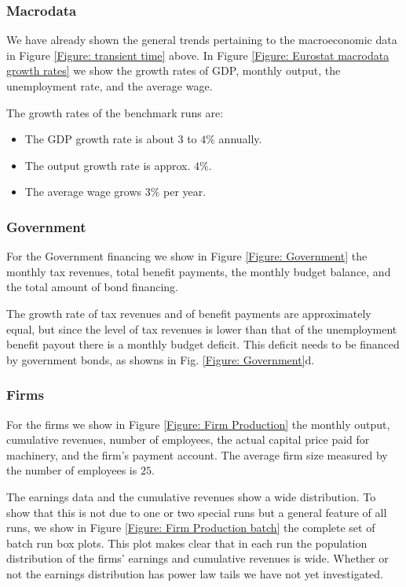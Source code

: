\subsubsection*{Macrodata}
We have already shown the general trends pertaining to the macroeconomic data in Figure \ref{Figure: transient time} above. 
In Figure \ref{Figure: Eurostat macrodata growth rates} we show the growth rates of GDP, monthly output, the unemployment rate, and the average wage.

The growth rates of the benchmark runs are:
\begin{itemize}
\item The GDP growth rate is about $3$ to $4\%$ annually.
\item The output growth rate is approx. $4\%$.
\item The average wage grows $3\%$ per year.
\end{itemize}

\subsubsection*{Government}
For the Government financing we show in Figure \ref{Figure: Government} the monthly tax revenues, total benefit payments, the monthly budget balance,
and the total amount of bond financing.

The growth rate of tax revenues and of benefit payments are approximately equal, but
since the level of tax revenues is lower than that of the unemployment benefit payout there is a monthly budget deficit.
This deficit needs to be financed by government bonds, as showns in Fig. \ref{Figure: Government}d.

\subsubsection*{Firms}
For the firms we show in Figure \ref{Figure: Firm Production} the monthly output, cumulative revenues, number of employees, the actual capital price paid for machinery, and the firm's payment account. The average firm size measured by the number of employees is $25$.

The earnings data and the cumulative revenues show a wide distribution. To show that this is not due to one or two special runs but a general feature of all runs, we  show in Figure \ref{Figure: Firm Production batch} the complete set of batch run box plots. This plot makes clear that in each run the population distribution of the firms' earnings and cumulative revenues is wide.
Whether or not the earnings distribution has power law tails we have not yet investigated.

